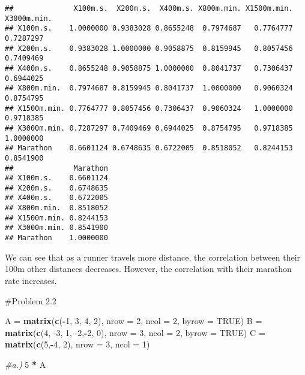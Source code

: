 \documentclass[
]{article}
\newenvironment{Shaded}{\begin{snugshade}}{\end{snugshade}}
\newcommand{\CommentTok}[1]{\textcolor[rgb]{0.56,0.35,0.01}{\textit{#1}}}
\newcommand{\DataTypeTok}[1]{\textcolor[rgb]{0.13,0.29,0.53}{#1}}
\newcommand{\DecValTok}[1]{\textcolor[rgb]{0.00,0.00,0.81}{#1}}
\newcommand{\KeywordTok}[1]{\textcolor[rgb]{0.13,0.29,0.53}{\textbf{#1}}}
\newcommand{\NormalTok}[1]{#1}
\newcommand{\OperatorTok}[1]{\textcolor[rgb]{0.81,0.36,0.00}{\textbf{#1}}}
\newcommand{\OtherTok}[1]{\textcolor[rgb]{0.56,0.35,0.01}{#1}}
\newcommand{\StringTok}[1]{\textcolor[rgb]{0.31,0.60,0.02}{#1}}
\begin{document}
\begin{verbatim}
##              X100m.s.  X200m.s.  X400m.s. X800m.min. X1500m.min. X3000m.min.
## X100m.s.    1.0000000 0.9383028 0.8655248  0.7974687   0.7764777   0.7287297
## X200m.s.    0.9383028 1.0000000 0.9058875  0.8159945   0.8057456   0.7409469
## X400m.s.    0.8655248 0.9058875 1.0000000  0.8041737   0.7306437   0.6944025
## X800m.min.  0.7974687 0.8159945 0.8041737  1.0000000   0.9060324   0.8754795
## X1500m.min. 0.7764777 0.8057456 0.7306437  0.9060324   1.0000000   0.9718385
## X3000m.min. 0.7287297 0.7409469 0.6944025  0.8754795   0.9718385   1.0000000
## Marathon    0.6601124 0.6748635 0.6722005  0.8518052   0.8244153   0.8541900
##              Marathon
## X100m.s.    0.6601124
## X200m.s.    0.6748635
## X400m.s.    0.6722005
## X800m.min.  0.8518052
## X1500m.min. 0.8244153
## X3000m.min. 0.8541900
## Marathon    1.0000000
\end{verbatim}

We can see that as a runner travels more distance, the correlation
between their 100m other distances decreases. However, the correlation
with their marathon rate increases.

\#Problem 2.2

\begin{Shaded}
\begin{Highlighting}[]
\NormalTok{A =}\StringTok{ }\KeywordTok{matrix}\NormalTok{(}\KeywordTok{c}\NormalTok{(}\OperatorTok{-}\DecValTok{1}\NormalTok{, }\DecValTok{3}\NormalTok{, }\DecValTok{4}\NormalTok{, }\DecValTok{2}\NormalTok{),}
           \DataTypeTok{nrow =} \DecValTok{2}\NormalTok{,}
           \DataTypeTok{ncol =} \DecValTok{2}\NormalTok{,}
           \DataTypeTok{byrow =} \OtherTok{TRUE}\NormalTok{)}
\NormalTok{B =}\StringTok{ }\KeywordTok{matrix}\NormalTok{(}\KeywordTok{c}\NormalTok{(}\DecValTok{4}\NormalTok{, }\DecValTok{-3}\NormalTok{, }\DecValTok{1}\NormalTok{, }\DecValTok{-2}\NormalTok{,}\OperatorTok{-}\DecValTok{2}\NormalTok{, }\DecValTok{0}\NormalTok{),}
           \DataTypeTok{nrow =} \DecValTok{3}\NormalTok{,}
           \DataTypeTok{ncol =} \DecValTok{2}\NormalTok{,}
           \DataTypeTok{byrow =} \OtherTok{TRUE}\NormalTok{)}
\NormalTok{C =}\StringTok{ }\KeywordTok{matrix}\NormalTok{(}\KeywordTok{c}\NormalTok{(}\DecValTok{5}\NormalTok{,}\OperatorTok{-}\DecValTok{4}\NormalTok{, }\DecValTok{2}\NormalTok{), }\DataTypeTok{nrow =} \DecValTok{3}\NormalTok{, }\DataTypeTok{ncol =} \DecValTok{1}\NormalTok{)}

\CommentTok{#a.)}
\DecValTok{5} \OperatorTok{*}\StringTok{ }\NormalTok{A}
\end{Highlighting}
\end{Shaded}
\end{document}
